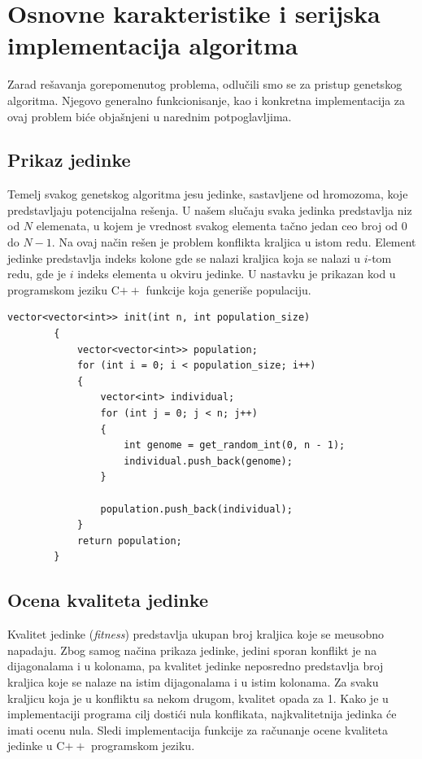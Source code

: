 \documentclass[12pt, a4paper]{article}
\begin{document}
	\newpage
	
	\section{Osnovne karakteristike i serijska implementacija algoritma}
	Zarad rešavanja gorepomenutog problema, odlučili smo se za pristup genetskog algoritma. Njegovo generalno funkcionisanje, kao i konkretna implementacija za ovaj problem biće objašnjeni u narednim potpoglavljima.
	
	\subsection{Prikaz jedinke}
	Temelj svakog genetskog algoritma jesu jedinke, sastavljene od hromozoma, koje predstavljaju potencijalna rešenja. U našem slučaju svaka jedinka predstavlja niz od $N$ elemenata, u kojem je vrednost svakog elementa tačno jedan ceo broj od 0 do $N-1$. Na ovaj način rešen je problem konflikta kraljica u istom redu. Element jedinke predstavlja indeks kolone gde se nalazi kraljica koja se nalazi u $i$-tom redu, gde je $i$ indeks elementa u okviru jedinke. U nastavku je prikazan kod u programskom jeziku C$++$ funkcije koja generiše populaciju.\\
	
	\begin{lstlisting}[caption={Funkcija za generisanje populacije}]
		vector<vector<int>> init(int n, int population_size)
		{
			vector<vector<int>> population;
			for (int i = 0; i < population_size; i++)
			{
				vector<int> individual;
				for (int j = 0; j < n; j++)
				{
					int genome = get_random_int(0, n - 1);
					individual.push_back(genome);
				}
				
				population.push_back(individual);
			}
			return population;
		}
	\end{lstlisting}
	
	\subsection{Ocena kvaliteta jedinke}
	Kvalitet jedinke (\textit{fitness}) predstavlja ukupan broj kraljica koje se me\dj usobno napadaju. Zbog samog načina prikaza jedinke, jedini sporan konflikt je na dijagonalama i u kolonama, pa kvalitet jedinke neposredno predstavlja broj kraljica koje se nalaze na istim dijagonalama i u istim kolonama. Za svaku kraljicu koja je u konfliktu sa nekom drugom, kvalitet opada za 1. Kako je u implementaciji programa cilj dostići nula konflikata, najkvalitetnija jedinka će imati ocenu nula. Sledi implementacija funkcije za računanje ocene kvaliteta jedinke u C$++$ programskom jeziku.\\\\
	
\end{document}
